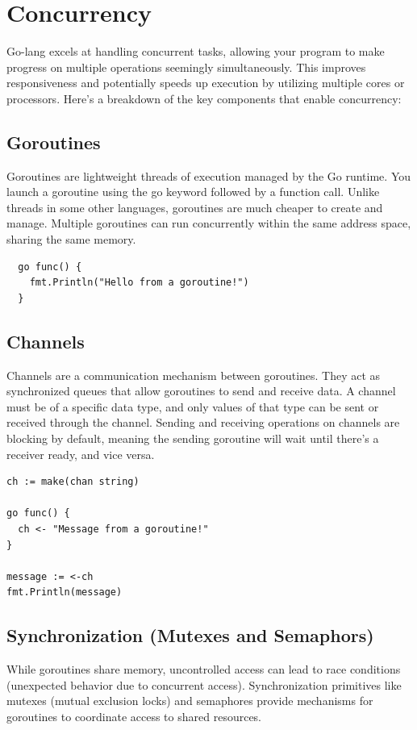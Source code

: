 \documentclass[letterpaper,12pt]{article}
\begin{document}
\section{Concurrency}
Go-lang excels at handling concurrent tasks, allowing your program to make progress on multiple operations seemingly simultaneously. This improves responsiveness and potentially speeds up execution by utilizing multiple cores or processors. Here's a breakdown of the key components that enable concurrency:
\subsection{Goroutines}
Goroutines are lightweight threads of execution managed by the Go runtime. You launch a goroutine using the go keyword followed by a function call. Unlike threads in some other languages, goroutines are much cheaper to create and manage. Multiple goroutines can run concurrently within the same address space, sharing the same memory.
\begin{verbatim}
  go func() {
    fmt.Println("Hello from a goroutine!")
  }
\end{verbatim}
\subsection{Channels}
Channels are a communication mechanism between goroutines. They act as synchronized queues that allow goroutines to send and receive data. A channel must be of a specific data type, and only values of that type can be sent or received through the channel. Sending and receiving operations on channels are blocking by default, meaning the sending goroutine will
wait until there's a receiver ready, and vice versa.
\begin{verbatim}
ch := make(chan string)

go func() {
  ch <- "Message from a goroutine!"
}

message := <-ch
fmt.Println(message)
\end{verbatim}

\subsection{Synchronization (Mutexes and Semaphors)}
While goroutines share memory, uncontrolled access can lead to race conditions (unexpected behavior due to concurrent access). Synchronization primitives like mutexes (mutual exclusion locks) and semaphores provide mechanisms for goroutines to coordinate access to shared resources.
\end{document}
